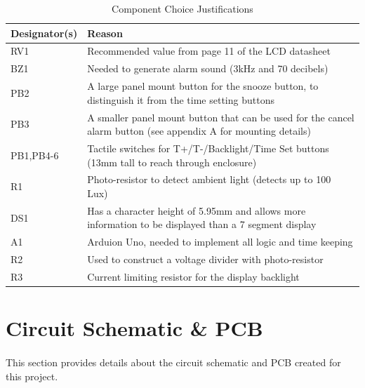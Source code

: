 \documentclass{article}
\begin{document}
\begin{landscape}
\begin{table}[h!]
    \centering
    \begin{tabular}{l|l}
        \textbf{Designator(s)} & \textbf{Reason} \\ \hline
        RV1                    & Recommended value from page 11 of the LCD datasheet\cite{lcd}\\\hline
        BZ1                    & Needed to generate alarm sound (3kHz and 70 decibels)\\\hline
        PB2                    & A large panel mount button for the snooze button, to distinguish it from the time setting buttons\\\hline
        PB3                    & A smaller panel mount button that can be used for the cancel alarm button (see appendix A for mounting details) \\\hline
        PB1,PB4-6              & Tactile switches for T+/T-/Backlight/Time Set buttons (13mm tall to reach through enclosure)\\\hline
        R1                     & Photo-resistor to detect ambient light (detects up to 100 Lux)\\\hline
        DS1                    & Has a character height of 5.95mm and allows more information to be displayed than a 7 segment display\\\hline
        A1                     & Arduion Uno, needed to implement all logic and time keeping\\\hline
        R2                     & Used to construct a voltage divider with photo-resistor\\\hline
        R3                     & Current limiting resistor for the display backlight
    \end{tabular}
    \caption{Component Choice Justifications}
    \label{tab:just}
\end{table}

\vfill
{\makebox[\linewidth]{\thepage}}
\end{landscape}


\section{Circuit Schematic \& PCB} %
\paragraph{}
This section provides details about the circuit schematic and PCB created for this project.
\end{document}
